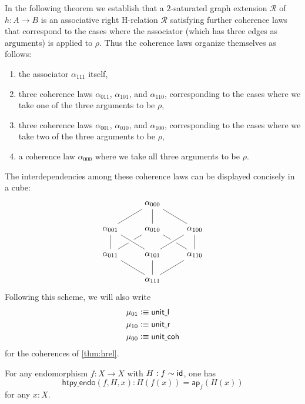 In the following theorem we establish that a $2$-saturated graph extension $\mathcal{R}$ of $h:A\to B$ is an associative right H-relation $\mathcal{R}$ satisfying further coherence laws that correspond to the cases where the associator (which has three edges as arguments) is applied to $\rho$. Thus the coherence laws organize themselves as follows:
\begin{enumerate}
\item the associator $\alpha_{111}$ itself,
\item three coherence laws $\alpha_{011}$, $\alpha_{101}$, and $\alpha_{110}$, corresponding to the cases where we take one of the three arguments to be $\rho$,
\item three coherence laws $\alpha_{001}$, $\alpha_{010}$, and $\alpha_{100}$, corresponding to the cases where we take two of the three arguments to be $\rho$,
\item a coherence law $\alpha_{000}$ where we take all three arguments to be $\rho$.
\end{enumerate}
The interdependencies among these coherence laws can be displayed concisely in a cube:
\begin{equation*}
\begin{tikzcd}
& \alpha_{000} \arrow[dl,-] \arrow[d,-] \arrow[dr,-] \\
\alpha_{001} \arrow[d,-] & \alpha_{010} \arrow[dl,-] \arrow[dr,-] & \alpha_{100} \arrow[d,-] \\
\alpha_{011} \arrow[dr,-] & \alpha_{101} \arrow[d,-] \arrow[from=ul,crossing over,-] \arrow[from=ur,crossing over,-] & \alpha_{110} \arrow[dl,-] \\
& \alpha_{111}
\end{tikzcd}
\end{equation*}
Following this scheme, we will also write
\begin{align*}
\mu_{01} & \vcentcolon\equiv \mathsf{unit\underline{~}l} \\
\mu_{10} & \vcentcolon\equiv \mathsf{unit\underline{~}r} \\
\mu_{00} & \vcentcolon\equiv \mathsf{unit\underline{~}coh}
\end{align*}
for the coherences of \autoref{thm:hrel}.

\begin{defn}
For any endomorphism $f:X\to X$ with $H:f\sim \mathsf{id}_{}$, one has
\begin{equation*}
\mathsf{htpy\underline{~}endo}(f,H,x):H(f(x))=\mathsf{ap}_f(H(x))
\end{equation*}
for any $x:X$.
\end{defn}

